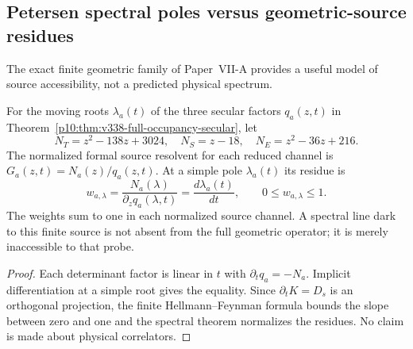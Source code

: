 \documentclass[12pt,a4paper]{article}
\begin{document}
\subsection{Petersen spectral poles versus geometric-source residues}
\label{p11:sec:v338-source-poles-boundary}
The exact finite geometric family of Paper~VII-A provides a useful
model of source accessibility, not a predicted physical spectrum.

\begin{proposition}
\label{p11:prop:v338-formal-source-residues}
For the moving roots $\lambda_a(t)$ of the three secular factors
$q_a(z,t)$ in Theorem~\ref{p10:thm:v338-full-occupancy-secular}, let
\[
 N_T=z^2-138z+3024,\quad N_S=z-18,\quad
 N_E=z^2-36z+216.
\]
The normalized formal source resolvent for each reduced channel is
$G_a(z,t)=N_a(z)/q_a(z,t)$.  At a simple pole $\lambda_a(t)$
its residue is
\[
 w_{a,\lambda}=\frac{N_a(\lambda)}{\partial_zq_a(\lambda,t)}
    =\frac{d\lambda_a(t)}{dt},
 \qquad 0\leq w_{a,\lambda}\leq1.
\]
The weights sum to one in each normalized source channel.
A spectral line dark to this finite source is not absent from the
full geometric operator; it is merely inaccessible to that probe.
\end{proposition}
\begin{proof}
Each determinant factor is linear in $t$ with
$\partial_tq_a=-N_a$.  Implicit differentiation at a simple root
gives the equality.  Since $\partial_tK=D_s$ is an orthogonal
projection, the finite Hellmann--Feynman formula bounds the slope
between zero and one and the spectral theorem normalizes the
residues.  No claim is made about physical correlators.
\end{proof}
\end{document}
